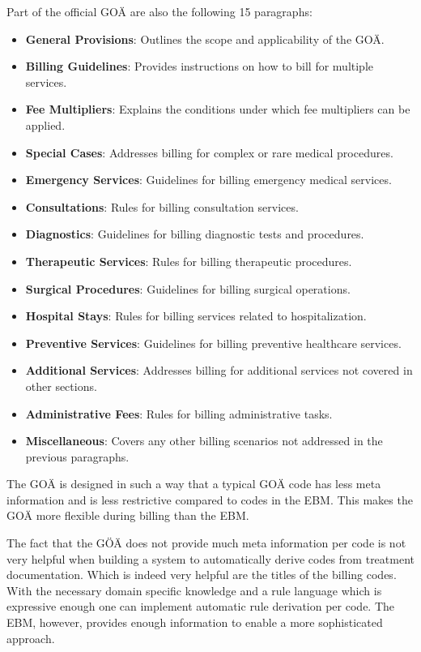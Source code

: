 Part of the official GOÄ are also the following 15 paragraphs\cite[]{hermanns2011gebuhrenordnung}:
\begin{itemize}
    \item \textbf{General Provisions}: Outlines the scope and applicability of the GOÄ.
    \item \textbf{Billing Guidelines}: Provides instructions on how to bill for multiple services.
    \item \textbf{Fee Multipliers}: Explains the conditions under which fee multipliers can be applied.
    \item \textbf{Special Cases}: Addresses billing for complex or rare medical procedures.
    \item \textbf{Emergency Services}: Guidelines for billing emergency medical services.
    \item \textbf{Consultations}: Rules for billing consultation services.
    \item \textbf{Diagnostics}: Guidelines for billing diagnostic tests and procedures.
    \item \textbf{Therapeutic Services}: Rules for billing therapeutic procedures.
    \item \textbf{Surgical Procedures}: Guidelines for billing surgical operations.
    \item \textbf{Hospital Stays}: Rules for billing services related to hospitalization.
    \item \textbf{Preventive Services}: Guidelines for billing preventive healthcare services.
    \item \textbf{Additional Services}: Addresses billing for additional services not covered in other sections.
    \item \textbf{Administrative Fees}: Rules for billing administrative tasks.
    \item \textbf{Miscellaneous}: Covers any other billing scenarios not addressed in the previous paragraphs.
\end{itemize}


The GOÄ is designed in such a way that a typical GOÄ code has less meta information and is less restrictive compared to codes in the EBM.
This makes the GOÄ more flexible during billing than the EBM.



The fact that the GÖÄ does not provide much meta information per code is not very helpful when building a system to automatically derive codes from treatment documentation.
Which is indeed very helpful are the titles of the billing codes.
With the necessary domain specific knowledge and a rule language which is expressive enough one can implement automatic rule derivation per code.
The EBM, however, provides enough information to enable a more sophisticated approach.

